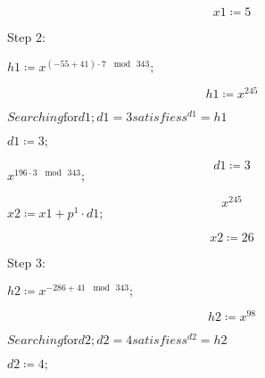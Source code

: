 \documentclass[11pt,a4paper,fleqn]{article}
\begin{document}
\begin{enumerate}[1.]
\begin{flushleft}
\begin{enumerate}
\begin{mdframed}
					\begin{dmath}\label{(6)}
						\mathit{x1} \coloneqq 5
					\end{dmath}
					\begin{Maple Normal}
						Step 2:
					\end{Maple Normal}
					\mapleinput
					{$ \displaystyle \mathit{h1} \coloneqq x^{\mathit{(-55+41)}\cdot 7\,\mod \,343}; $}

					\begin{dmath}\label{(7)}
						\mathit{h1} \coloneqq x^{245}
					\end{dmath}
					\begin{Maple Normal}
						{$ \displaystyle \mathit{Searching} \boldsymbol{\mathrm{for}}\mathit{d1} ;\mathit{d1} =3\mathit{satisfies} s^{\mathit{d1}}=\mathit{h1}  $}
					\end{Maple Normal}
					\mapleinput
					{$ \displaystyle \mathit{d1} \coloneqq 3; $}

					\begin{dmath}\label{(8)}
						\mathit{d1} \coloneqq 3
					\end{dmath}
					\mapleinput
					{$ \displaystyle x^{196\cdot 3\,\mod \,343}; $}

					\begin{dmath}\label{(9)}
						x^{245}
					\end{dmath}
					\mapleinput
					{$ \displaystyle \mathit{x2} \coloneqq \mathit{x1} +p^{1}\cdot \mathit{d1} ; $}

					\begin{dmath}\label{(10)}
						\mathit{x2} \coloneqq 26
					\end{dmath}
					\begin{Maple Normal}
						Step 3:
					\end{Maple Normal}
					\mapleinput
					{$ \displaystyle \mathit{h2} \coloneqq x^{-286+41\,\mod \,343}; $}

					\begin{dmath}\label{(11)}
						\mathit{h2} \coloneqq x^{98}
					\end{dmath}
					\begin{Maple Normal}
						{$ \displaystyle \mathit{Searching} \boldsymbol{\mathrm{for}}\mathit{d2} ;\mathit{d2} =4\mathit{satisfies} s^{\mathit{d2}}=\mathit{h2}  $}
					\end{Maple Normal}
					\mapleinput
					{$ \displaystyle \mathit{d2} \coloneqq 4; $}


\end{mdframed}
\end{enumerate}
\end{flushleft}
\end{enumerate}
\end{document}
